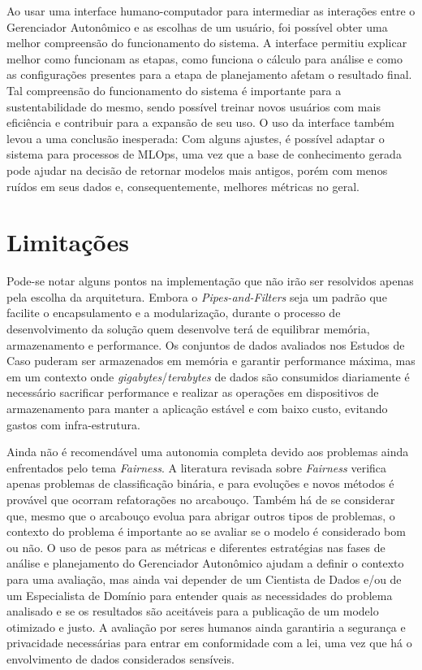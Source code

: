 \documentclass[portugues]{ic-tese}
\begin{document}
Ao usar uma interface humano-computador para intermediar as interações entre o Gerenciador Autonômico e as escolhas de um usuário, foi possível obter uma melhor compreensão do funcionamento do sistema. A interface permitiu explicar melhor como funcionam as etapas, como funciona o cálculo para análise e como as configurações presentes para a etapa de planejamento afetam o resultado final. Tal compreensão do funcionamento do sistema é importante para a sustentabilidade do mesmo, sendo possível treinar novos usuários com mais eficiência e contribuir para a expansão de seu uso. O uso da interface também levou a uma conclusão inesperada: Com alguns ajustes, é possível adaptar o sistema para processos de MLOps, uma vez que a base de conhecimento gerada pode ajudar na decisão de retornar modelos mais antigos, porém com menos ruídos em seus dados e, consequentemente, melhores métricas no geral. 

\section{Limitações}

Pode-se notar alguns pontos na implementação que não irão ser resolvidos apenas pela escolha da arquitetura. Embora o \textit{Pipes-and-Filters} seja um padrão que facilite o encapsulamento e a modularização, durante o processo de desenvolvimento da solução quem desenvolve terá de equilibrar memória, armazenamento e performance. Os conjuntos de dados avaliados nos Estudos de Caso puderam ser armazenados em memória e garantir performance máxima, mas em um contexto onde \textit{gigabytes}/\textit{terabytes} de dados são consumidos diariamente é necessário sacrificar performance e realizar as operações em dispositivos de armazenamento para manter a aplicação estável e com baixo custo, evitando gastos com infra-estrutura.

Ainda não é recomendável uma autonomia completa devido aos problemas ainda enfrentados pelo tema \textit{Fairness}. A literatura revisada sobre \textit{Fairness} verifica apenas problemas de classificação binária, e para evoluções e novos métodos é provável que ocorram refatorações no arcabouço. Também há de se considerar que, mesmo que o arcabouço evolua para abrigar outros tipos de problemas, o contexto do problema é importante ao se avaliar se o modelo é considerado bom ou não. O uso de pesos para as métricas e diferentes estratégias nas fases de análise e planejamento do Gerenciador Autonômico ajudam a definir o contexto para uma avaliação, mas ainda vai depender de um Cientista de Dados e/ou de um Especialista de Domínio para entender quais as necessidades do problema analisado e se os resultados são aceitáveis para a publicação de um modelo otimizado e justo. A avaliação por seres humanos ainda garantiria a segurança e privacidade necessárias para entrar em conformidade com a lei, uma vez que há o envolvimento de dados considerados sensíveis.
\end{document}
